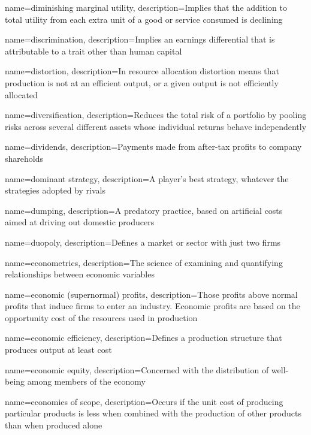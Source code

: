 {
	name={diminishing marginal utility},
	description={Implies that the addition to total utility from each extra unit of a good or service consumed is declining}
}

{
	name=discrimination,
	description={Implies an earnings differential that is attributable to a trait other than human capital}
}

{
	name=distortion,
	description={In resource allocation distortion means that production is not at an efficient output, or a given output is not efficiently allocated}
}

{
	name=diversification,
	description={Reduces the total risk of a portfolio by pooling risks across several different assets whose individual returns behave independently}
}

{
	name=dividends,
	description={Payments made from after-tax profits to company shareholds}
}

{
	name={dominant strategy},
	description={A player's best strategy, whatever the strategies adopted by rivals}
}

{
	name=dumping,
	description={A predatory practice, based on artificial costs aimed at driving out domestic producers}
}

{
	name=duopoly,
	description={Defines a market or sector with just two firms}
}

{
	name=econometrics,
	description={The science of examining and quantifying relationships between economic variables}
}

{
	name={economic (supernormal) profits},
	description={Those profits above normal profits that induce firms to enter an industry. Economic profits are based on the opportunity cost of the resources used in production}
}

{
	name={economic efficiency},
	description={Defines a production structure that produces output at least cost}
}

{
	name={economic equity},
	description={Concerned with the distribution of well-being among members of the economy}
}

{
	name={economies of scope},
	description={Occurs if the unit cost of producing particular products is less when combined with the production of other products than when produced alone}
}

